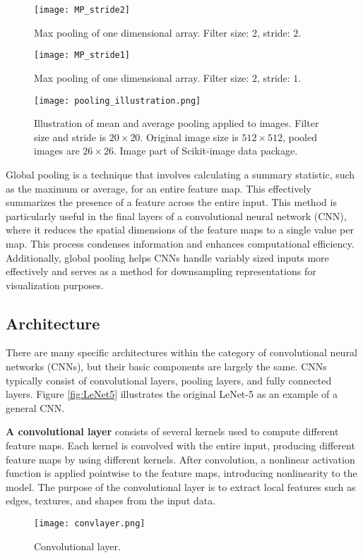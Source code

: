 \documentclass[../../thesis.tex]{subfiles}
\begin{document}
\begin{figure}[h]
    \texttt{[image: MP\_stride2]}
    \centering    
    \caption{Max pooling of one dimensional array. Filter size: $2$, stride: $2$.}
    \label{fig:mp2}
\end{figure}
\begin{figure}[h]
    \texttt{[image: MP\_stride1]}
    \centering    
    \caption{Max pooling of one dimensional array. Filter size: $2$, stride: $1$.}
    \label{fig:mp1}
\end{figure}

\begin{figure}[h]
    \centering
    \texttt{[image: pooling\_illustration.png]}
    \caption{Illustration of mean and average pooling applied to images. Filter size and stride is $20\times 20$. Original image size is $512\times 512$, pooled images are $26\times26$. Image part of Scikit-image data package.}
    \label{fig:mean_max_pool}
\end{figure}

Global pooling is a technique that involves calculating a summary statistic, such as the maximum or average, for an entire feature map. This effectively summarizes the presence of a feature across the entire input. This method is particularly useful in the final layers of a convolutional neural network (CNN), where it reduces the spatial dimensions of the feature maps to a single value per map. This process condenses information and enhances computational efficiency. Additionally, global pooling helps CNNs handle variably sized inputs more effectively and serves as a method for downsampling representations for visualization purposes.

\subsection{Architecture}
There are many specific architectures within the category of convolutional neural networks (CNNs), but their basic components are largely the same. CNNs typically consist of convolutional layers, pooling layers, and fully connected layers. Figure \ref{fig:LeNet5} illustrates the original LeNet-5 \cite{LeCun1989ConvNet} as an example of a general CNN.\newline

\textbf{A convolutional layer} consists of several kernels used to compute different feature maps. Each kernel is convolved with the entire input, producing different feature maps by using different kernels. After convolution, a nonlinear activation function is applied pointwise to the feature maps, introducing nonlinearity to the model. The purpose of the convolutional layer is to extract local features such as edges, textures, and shapes from the input data.
\begin{figure}[h]
    \centering
    \texttt{[image: convlayer.png]}
    \caption{Convolutional layer.}
    \label{fig:convlayer}
\end{figure}
\end{document}
